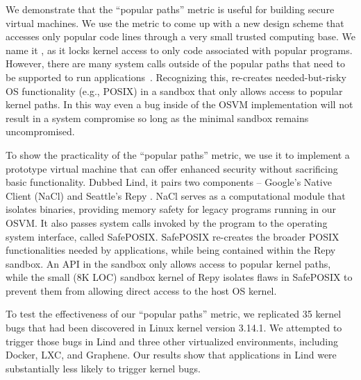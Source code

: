 We demonstrate that the ``popular paths'' metric is useful for building secure virtual machines. 
We use the metric to come up with a new design scheme that
accesses only popular code lines through a very small trusted computing base.
We name it \lip, as it locks kernel access to only code
associated with popular programs. %
However, there are many system calls outside of the popular paths that need to
be supported to run applications~\cite{tsai2016study}.  Recognizing this,
 \lip re-creates needed-but-risky OS functionality
(e.g., POSIX) in a sandbox that only allows access to popular kernel paths.
In this way even a bug inside of the OSVM implementation will not result in a system compromise
so long as the minimal sandbox remains uncompromised.


To show the practicality of the ``popular paths'' metric, we use it to implement a
prototype virtual machine that can offer enhanced security without sacrificing
basic functionality. Dubbed Lind, it pairs two components -- Google's Native Client
(NaCl) \cite{NaCl-09} and Seattle's Repy \cite{Repy-10}.
NaCl serves as a computational module that isolates
binaries, providing memory safety for legacy programs running in our OSVM.
It also passes system calls invoked by the program to the operating system interface, called SafePOSIX.
SafePOSIX re-creates the broader POSIX functionalities needed by applications, while being contained within the Repy sandbox. 
An API in the sandbox only allows access to popular kernel paths, while
the small (8K LOC) sandbox kernel of Repy isolates flaws in SafePOSIX
to prevent them from allowing direct access to the host OS kernel.

To test the effectiveness of our ``popular paths'' metric, 
we replicated 35 kernel bugs that had been
discovered in Linux kernel version 3.14.1.  We attempted to trigger those
bugs in Lind and three other virtualized environments,
including Docker, LXC, and Graphene.
Our results show that applications in Lind were substantially less likely to trigger
kernel bugs.

